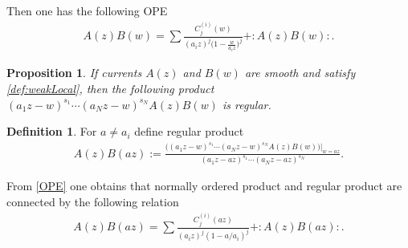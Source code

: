 \documentclass[11pt]{article}
\numberwithin{equation}{section}
\newtheorem{Proposition}[Theorem]{Proposition}
\theoremstyle{definition}
\newtheorem{Definition}[Theorem]{Definition}
\begin{document}
Then one has the following OPE
\begin{gather}
A(z) B(w) = \sum \frac{C_{j}^{(i)} \! (w)}{(a_i z)^j \big(1-\frac{w}{a_i z} \big)^{j}}+: \! A(z) B(w) \! :. \label{OPE}
\end{gather}
\begin{Proposition}
If currents $A(z)$ and $B(w)$ are smooth and satisfy \eqref{def:weakLocal}, then the following product \mbox{$(a_1 z - w)^{s_1} \cdots (a_N z - w)^{s_N} A(z) B(w)$} is regular.
\end{Proposition}
\begin{Definition} \label{def: the product}
For $a \neq a_i$ define regular product
\begin{gather*}
A(z) B(az) := \frac{ \big( (a_1 z - w)^{s_1} \cdots (a_N z - w)^{s_N} A(z) B(w) \big) \big|_{w=az}}{(a_1 z - az)^{s_1} \cdots (a_N z - az)^{s_N}}.
\end{gather*}
\end{Definition}

From \eqref{OPE} one obtains that normally ordered product and regular product are connected by the following relation
\begin{gather*}
A(z) B(az) = \sum \frac{C_{j}^{(i)} \! (az)}{(a_i z)^j (1-a/a_i)^{j}}+: \! A(z) B(az) \! :.
\end{gather*}
\end{document}
